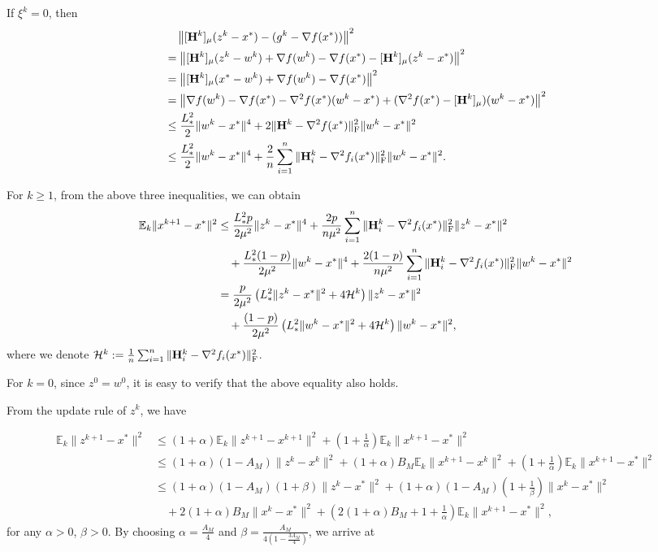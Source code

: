 \documentclass[11pt]{article}
\begin{document}
	If $\xi^k = 0$, then 
	\begin{align}
		& \quad \left\|   [\mathbf{H}^k]_\mu (z^k - x^*) - (g^k - \nabla f(x^*))   \right\|^2 \nonumber \\ 
		& = \left\|  [\mathbf{H}^k]_\mu(z^k-w^k) + \nabla f(w^k) - \nabla f(x^*) - [\mathbf{H}^k]_\mu (z^k - x^*)  \right\|^2 \nonumber \\ 
		& = \left\|  [\mathbf{H}^k]_\mu(x^* - w^k) +   \nabla f(w^k) - \nabla f(x^*)  \right\|^2 \nonumber \\ 
		& = \left\| \nabla f(w^k) - \nabla f(x^*) - \nabla^2 f(x^*) (w^k-x^*) + (\nabla^2 f(x^*) - [\mathbf{H}^k]_\mu) (w^k-x^*)   \right\|^2 \nonumber \\ 
		& \leq \frac{L_{*}^2}{2}\|w^k-x^*\|^4 +  2\| \mathbf{H}^k - \nabla^2 f(x^*)\|_{\rm F}^2 \|w^k-x^*\|^2 \nonumber \\ 
		& \leq \frac{L_{*}^2}{2}\|w^k-x^*\|^4 +  \frac{2}{n} \sum_{i=1}^n \| \mathbf{H}_i^k - \nabla^2 f_i(x^*) \|^2_{\rm F} \|w^k-x^*\|^2. \label{eq:33-BL1}
	\end{align}
	
	For $k\geq 1$, from the above three inequalities, we can obtain 
	\begin{align}
		\mathbb{E}_k \|x^{k+1} - x^*\|^2 & \leq \frac{L_{*}^2p}{2\mu^2} \|z^k - x^*\|^4 + \frac{2p}{n \mu^2} \sum_{i=1}^n \| \mathbf{H}_i^k - \nabla^2 f_i(x^*) \|^2_{\rm F} \|z^k-x^*\|^2 \nonumber \\ 
		& \quad + \frac{L_{*}^2(1-p)}{2\mu^2}\|w^k-x^*\|^4 +  \frac{2(1-p)}{n \mu^2} \sum_{i=1}^n \| \mathbf{H}_i^k - \nabla^2 f_i(x^*) \|^2_{\rm F} \|w^k-x^*\|^2 \nonumber \\ 
		& = \frac{p}{2\mu^2} \left(  L_{*}^2 \|z^k-x^*\|^2 + 4 {\cal H}^k  \right) \|z^k-x^*\|^2 \nonumber \\ 
		& \quad  + \frac{(1-p)}{2\mu^2} \left(  L_{*}^2 \|w^k-x^*\|^2 + 4 {\cal H}^k  \right) \|w^k-x^*\|^2,  \label{eq:xk+1-BL1}
	\end{align}
	where we denote ${\cal H}^k \; { := }\; \frac{1}{n} \sum_{i=1}^n \|\mathbf{H}_i^k - \nabla^2 f_i(x^*)\|_{\rm F}^2$. 
	
	For $k=0$, since $z^0=w^0$, it is easy to verify that the above equality also holds. 
	
	From the update rule of $z^k$, we have 
	
	\begin{align*}
		\mathbb{E}_k \|z^{k+1}-x^*\|^2 & \leq (1+\alpha) \mathbb{E}_k\|z^{k+1} - x^{k+1}\|^2 + \left(1+ \frac{1}{\alpha}\right) \mathbb{E}_k\|x^{k+1}-x^*\|^2 \\ 
		& \leq (1+\alpha) (1-A_M)\|z^k-x^k\|^2 + (1+\alpha)B_M\mathbb{E}_k\|x^{k+1}-x^k\|^2 +  \left(1+ \frac{1}{\alpha}\right) \mathbb{E}_k\|x^{k+1}-x^*\|^2 \\ 
		& \leq (1+\alpha)(1-A_M)(1+\beta) \|z^k-x^*\|^2 + (1+\alpha)(1-A_M)\left(  1 + \frac{1}{\beta}  \right) \|x^k-x^*\|^2 \\ 
		& \quad + 2(1+\alpha)B_M\|x^k-x^*\|^2 + \left(  2(1+\alpha)B_M + 1 + \frac{1}{\alpha}  \right) \mathbb{E}_k\|x^{k+1}-x^*\|^2,
	\end{align*}
	for any $\alpha>0$, $\beta>0$. By choosing $\alpha = \frac{A_M}{4}$ and $\beta = \frac{A_M}{4(1-\frac{3A_M}{4})}$, we arrive at 
	
\end{document}
